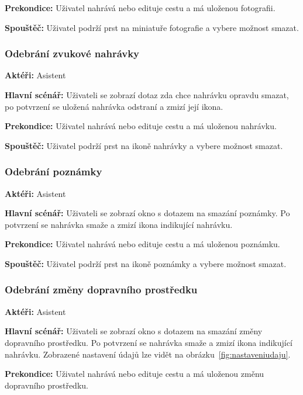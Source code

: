 \documentclass[czech,master,public,dept460,male,java,cpdeclaration]{diploma}
\newcommand{\usecase}[2]{\subsubsection{#1}\label{#2}}
\begin{document}
\vspace{0.1cm}
\noindent
\textbf{Prekondice:} Uživatel nahrává nebo edituje cestu a má uloženou fotografii.

\vspace{0.1cm}
\noindent
\textbf{Spouštěč:} Uživatel podrží prst na miniatuře fotografie a vybere možnost smazat.



\usecase{Odebrání zvukové nahrávky}{odebraninahravky}
\textbf{Aktéři:} Asistent

\vspace{0.1cm}
\noindent
\textbf{Hlavní scénář:} Uživateli se zobrazí dotaz zda chce nahrávku opravdu smazat, po potvrzení
se uložená nahrávka odstraní a zmizí její ikona.

\vspace{0.1cm}
\noindent
\textbf{Prekondice:} Uživatel nahrává nebo edituje cestu a má uloženou nahrávku.

\vspace{0.1cm}
\noindent
\textbf{Spouštěč:} Uživatel podrží prst na ikoně nahrávky a vybere možnost smazat.



\usecase{Odebrání poznámky}{odebranipoznamky}
\textbf{Aktéři:} Asistent

\vspace{0.1cm}
\noindent
\textbf{Hlavní scénář:} Uživateli se zobrazí okno s dotazem na smazání poznámky. Po potvrzení se
nahrávka smaže a zmizí ikona indikující nahrávku.

\vspace{0.1cm}
\noindent
\textbf{Prekondice:} Uživatel nahrává nebo edituje cestu a má uloženou poznámku.

\vspace{0.1cm}
\noindent
\textbf{Spouštěč:} Uživatel podrží prst na ikoně poznámky a vybere možnost smazat.


\usecase{Odebrání změny dopravního prostředku}{odebranizmenyprostredku}
\textbf{Aktéři:} Asistent

\vspace{0.1cm}
\noindent
\textbf{Hlavní scénář:} Uživateli se zobrazí okno s dotazem na smazání změny dopravního prostředku.
Po potvrzení se nahrávka smaže a zmizí ikona indikující nahrávku. Zobrazené nastavení údajů
lze vidět na obrázku~\ref{fig:nastaveniudaju}.

\vspace{0.1cm}
\noindent
\textbf{Prekondice:} Uživatel nahrává nebo edituje cestu a má uloženou změnu dopravního prostředku.
\end{document}
